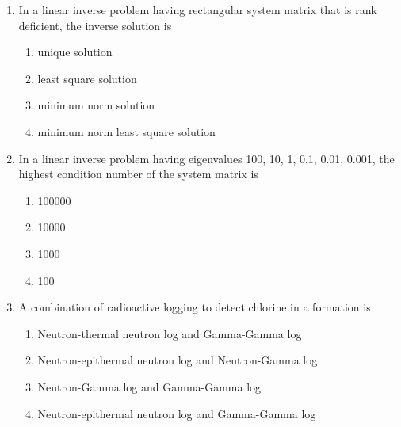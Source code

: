 \documentclass[journal,12pt,onecolumn]{IEEEtran}
\theoremstyle{remark}
\begin{document}
\begin{enumerate}
    \item In a linear inverse problem having rectangular system matrix that is rank deficient, the inverse solution is

    \hfill{}
    
    \begin{multicols}{2}
        \begin{enumerate}
            \item unique solution
            \item least square solution
            \item minimum norm solution
            \item minimum norm least square solution
        \end{enumerate}
    \end{multicols}

    \item In a linear inverse problem having eigenvalues 100, 10, 1, 0.1, 0.01, 0.001, the highest condition number of the system matrix is

    \hfill{}
    
    \begin{multicols}{4}
        \begin{enumerate}
            \item 100000
            \item 10000
            \item 1000
            \item 100
        \end{enumerate}
    \end{multicols}

    \item A combination of radioactive logging to detect chlorine in a formation is

    \hfill{}
    
    \begin{multicols}{1}
        \begin{enumerate}
            \item Neutron-thermal neutron log and Gamma-Gamma log
            \item Neutron-epithermal neutron log and Neutron-Gamma log
            \item Neutron-Gamma log and Gamma-Gamma log
            \item Neutron-epithermal neutron log and Gamma-Gamma log
        \end{enumerate}
    \end{multicols}


\end{enumerate}
\end{document}
